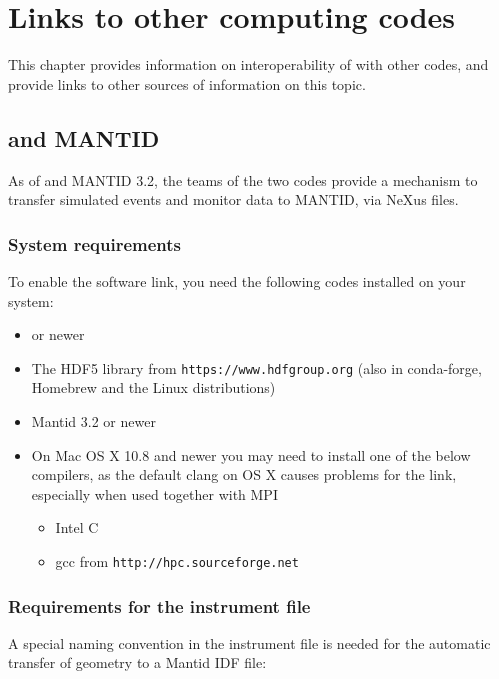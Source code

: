 \chapter{Links to other computing codes}

This chapter provides information on interoperability of \MCS with
other codes, and provide links to other sources of information on this topic.

\section{\MCS and MANTID}

As of  and MANTID 3.2, the teams of the two codes provide a mechanism to transfer simulated \MCS
events and monitor data to MANTID, via NeXus files.

\subsection{System requirements}
To enable the software link, you need the following codes installed on
your system:
\begin{itemize}
\item{ or newer}
\item{The HDF5 library from \verb+https://www.hdfgroup.org+ (also in conda-forge, Homebrew and the Linux distributions)}
\item{Mantid 3.2 or newer}
\item{On Mac OS X 10.8 and newer you may need to install one of the
    below compilers, as the default clang on OS X causes problems for
    the link, especially when used together with MPI}
  \begin{itemize}
  \item{Intel C}
  \item{gcc from \verb+http://hpc.sourceforge.net+}
  \end{itemize}
\end{itemize}

\subsection{Requirements for the instrument file}
A special naming convention in the instrument file is needed for the
automatic transfer of geometry to a Mantid IDF file:

